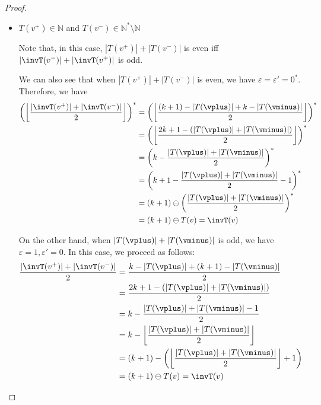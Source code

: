 \documentclass{article}\providecommand{\nequiv}{\not\equiv}\usepackage[a4paper,margin=20mm]{geometry}
\newcommand{\Nat}{\mathbb{N}}
\newcommand{\Natstro}{\mathbb{N}^* \setminus \mathbb{N}}
\newcommand{\eps}{\varepsilon}
\DeclarePairedDelimiter{\adjustfloor}{\lfloor}{\rfloor}
\newcommand{\floor}[1]{\adjustfloor*{#1}}
\newcommand{\absolut}[1]{|#1|}
\begin{document}
\begin{proof}
\begin{itemize}
		When \(\eps = \eps' = 1\) (i.e., the sum is odd and the minimum is in \(\Natstro\)), we have 
		\begin{align*}
			\floor{\frac{|\invT(v^+)|+|\invT(v^-)|}{2}} + 1 &= \floor{\frac{(k - |T(\vplus)|) + (k - |T(\vminus)|)}{2}} + 1\\
			&= \floor{k - \frac{|T(\vminus)| + |T(\vplus)|}{2}} + 1\\
			&= k - \floor{\frac{|T(\vplus)| + |T(\vminus)|}{2}} - 1 + 1\\
			&= (k+1) - \left(\floor{\frac{|T(\vplus)| + |T(\vminus)|}{2}} + 1\right)\\
			&= (k+1) \ominus T(v) = \invT(v)
		\end{align*}
		
		\smallskip
		
		\item \(T(v^+) \in \Nat\) and \(T(v^-) \in \Natstro\)
		
		Note that, in this case, \(|T(v^+)|+|T(v^-)|\) is even iff  \(|\invT(v^-)|+|\invT(v^+)|\) is odd.
		
		We can also see that when \(|T(v^+)|+|T(v^-)|\) is even, we have \(\eps = \eps' = 0^*\). 
		Therefore, we have 
		\begin{align*}
			\left(\floor{\frac{|\invT(v^+)|+|\invT(v^-)|}{2}}\right)^* &= 
			\left(\floor{\frac{(k+1) - |T(\vplus)| + k - |T(\vminus)|}{2}}\right)^* \\
			&= \left(\floor{\frac{2k+1 - (|T(\vplus)|+|T(\vminus)|)}{2}}\right)^*\\
			&= \left(k - \frac{|T(\vplus)| + |T(\vminus)|}{2}\right)^*\\
			&= \left(k+1 - \frac{|T(\vplus)| + |T(\vminus)|}{2} - 1\right)^*\\
			&= (k+1) \ominus \left(\frac{|T(\vplus)| + |T(\vminus)|}{2}\right)^*\\
			&= (k+1) \ominus T(v) = \invT(v)
		\end{align*}
		
		On the other hand, when \(|T(\vplus)| + |T(\vminus)|\) is odd, we have \(\eps = 1, \eps' = 0\). 
		In this case, we proceed as follows:
		\begin{align*}
			\frac{|\invT(v^+)|+|\invT(v^-)|}{2} &= \frac{k - |T(\vplus)| + (k+1) - |T(\vminus)|}{2}\\
			&= \frac{2k+1 - (\absolut{T(\vplus)}+\absolut{T(\vminus)})}{2}\\
			&= k - \frac{\absolut{T(\vplus)} + \absolut{T(\vminus)} -1}{2}\\
			&= k - \floor{\frac{\absolut{T(\vplus)}+ \absolut{T(\vminus)}}{2}}\\
			&= (k+1) - \left(\floor{\frac{\absolut{T(\vplus)}+ \absolut{T(\vminus)}}{2}} + 1\right)\\
			&= (k+1) \ominus T(v) = \invT(v) 
		\end{align*}
		

\end{itemize}
\end{proof}
\end{document}
